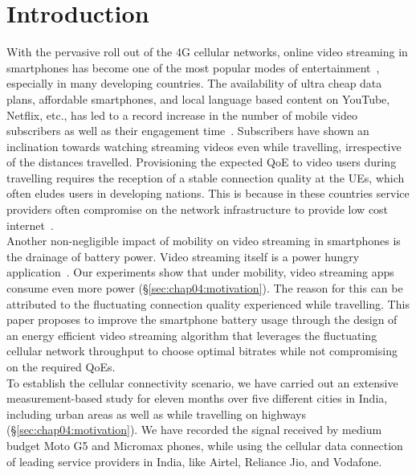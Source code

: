 \section{\textbf{Introduction}}\label{sec:chap04:intro}
With the pervasive roll out of the \ac{4G} cellular networks, online video streaming in smartphones has become one of the most popular modes of entertainment~\cite{CISCO2019}, especially in many developing countries. The availability of ultra cheap data plans, affordable smartphones, and local language based content on YouTube, Netflix, etc., has led to a record increase in the number of mobile video subscribers as well as their engagement time~\cite{Mobstat_2019}.  Subscribers have  shown an inclination towards watching streaming videos even while travelling, irrespective of the distances travelled. Provisioning the expected \ac{QoE} to video users during travelling requires the reception of a stable connection quality at the \acp{UE}, which often eludes users in developing nations. This is because in these countries service providers often compromise on the network infrastructure to provide low cost internet~\cite{Poor_Inf_2019_2}. \\
\indent Another non-negligible impact of mobility on video streaming in  smartphones is the drainage of battery power.  Video streaming itself is a power hungry application~\cite{Xin2012}. Our experiments show that under mobility, video streaming apps consume even more power (\S\ref{sec:chap04:motivation}). The reason for this can be attributed to the fluctuating connection quality experienced while travelling.  This paper proposes to improve the smartphone battery usage through the design of an energy efficient video streaming algorithm that leverages the fluctuating cellular network throughput to choose optimal bitrates while not compromising on the required \ac{QoE}s. \\
\indent To establish the cellular connectivity scenario, 
we have carried out an extensive measurement-based study for eleven months over five different cities in India, including urban areas as well as while travelling on highways (\S\ref{sec:chap04:motivation}). We have recorded the signal received by  medium budget Moto G5 and Micromax phones, while using the cellular data connection of leading service providers in India, like Airtel, Reliance Jio, and Vodafone.
